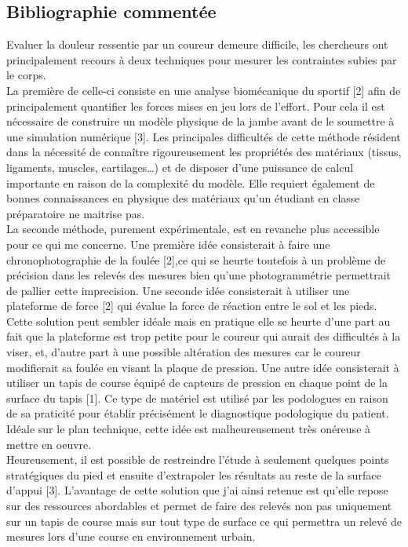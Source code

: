 \documentclass[11pt]{article}
\begin{document}
\subsection{Bibliographie commentée}
\label{sec:orgd7227c8}
Evaluer la douleur ressentie par un coureur demeure difficile, les chercheurs ont principalement recours à deux techniques pour mesurer les contraintes subies par le corps.\\\empty
La première de celle-ci consiste en une analyse biomécanique du sportif [2] afin de principalement quantifier les forces mises en jeu lors de l'effort. Pour cela il est nécessaire de construire un modèle physique de la jambe avant de le soumettre à une simulation numérique [3]. Les principales difficultés de cette méthode résident dans la nécessité de connaître rigoureusement les propriétés des matériaux (tissus, ligaments, muscles, cartilages\ldots{}) et de disposer d'une puissance de calcul importante en raison de la complexité du modèle. Elle requiert également de bonnes connaissances en physique des matériaux qu'un étudiant en classe préparatoire ne maitrise pas.\\\empty
La seconde méthode, purement expérimentale, est en revanche plus accessible pour ce qui me concerne. Une première idée consisterait à faire une chronophotographie de la foulée [2],ce qui se heurte toutefois à un problème de précision dans les relevés des mesures bien qu'une photogrammétrie permettrait de pallier cette imprecision. Une seconde idée consisterait à utiliser une plateforme de force [2] qui évalue la force de réaction entre le sol et les pieds. Cette solution peut sembler idéale mais en pratique elle se heurte d'une part au fait que la plateforme est trop petite pour le coureur qui aurait des difficultés à la viser, et, d'autre part à une possible altération des mesures car le coureur modifierait sa foulée en visant la plaque de pression. Une autre idée consisterait à utiliser un tapis de course équipé de capteurs de pression en chaque point de la surface du tapis [1]. Ce type de matériel est utilisé par les podologues en raison de sa praticité pour établir précisément le diagnostique podologique du patient. Idéale sur le plan technique, cette idée est malheureusement très onéreuse à mettre en oeuvre.\\\empty
Heureusement, il est possible de restreindre l'étude à seulement quelques points stratégiques du pied et ensuite d'extrapoler les résultats au reste de la surface d'appui [3]. L'avantage de cette solution que j'ai ainsi retenue est qu'elle repose sur des ressources abordables et permet de faire des relevés non pas uniquement sur un tapis de course mais sur tout type de surface ce qui permettra un relevé de mesures lors d'une course en environnement urbain.\\\empty
\end{document}

